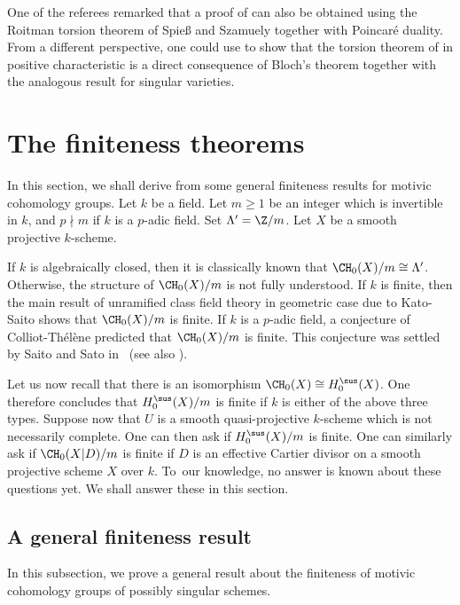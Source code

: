 \begin{remk}\label{remk:SS}
One of the referees remarked that a proof of  can also be
obtained using the Roitman torsion theorem of Spie{\ss} and Szamuely \cite{SS} together with Poincaré duality.
From a different perspective, one could use  to show that the torsion theorem
of \cite{SS} in positive characteristic is a direct consequence of
Bloch's theorem together with the analogous result for singular varieties.
\end{remk}

\section{The finiteness theorems}
\label{sec:Finiteness}
In this section, we shall derive  from
some general finiteness results for motivic cohomology groups.
Let $k$ be a field. Let $m \ge 1$ be an integer which is invertible in $k$,
and $p \nmid m$ if $k$ is a $p$-adic field. Set $\Lambda' = {\Z}/m$.
Let $X$ be a smooth projective $k$-scheme.

If $k$ is algebraically closed, then it is classically
known that ${\CH_0(X)}/m \cong \Lambda'$.
Otherwise, the structure of ${\CH_0(X)}/m$ is not fully understood.
If $k$ is finite, then the main result of unramified class field
theory in geometric case due to Kato-Saito \cite{Kato-Saito-1} shows that
${\CH_0(X)}/m$ is finite. If $k$ is a $p$-adic field, a conjecture of
Colliot-Thélène predicted that ${\CH_0(X)}/m$ is finite.
This conjecture was settled by Saito and Sato in~\cite{SaitoSatoAnnals}
(see also \cite[Prop.\,9.3]{EKW}).

Let us now recall that there is an isomorphism
${\CH_0(X)} \cong H^{\sus}_0(X)$. One therefore concludes that
${H^{\sus}_0(X)}/m$ is finite if $k$ is either of the above three types.
Suppose now that $U$ is a smooth quasi-projective $k$-scheme
which is not necessarily complete. One can then ask if
${H^{\sus}_0(X)}/m$ is finite. One can similarly ask
if ${\CH_0(X|D)}/m$ is finite if $D$ is an effective Cartier divisor on
a smooth projective scheme $X$ over $k$. To~our knowledge, no answer is known about
these questions yet. We shall answer these in this section.

\subsection{A general finiteness result}\label{sec:Fin-gen}
In this subsection, we prove a general result about the finiteness of motivic
cohomology groups of possibly singular schemes.

